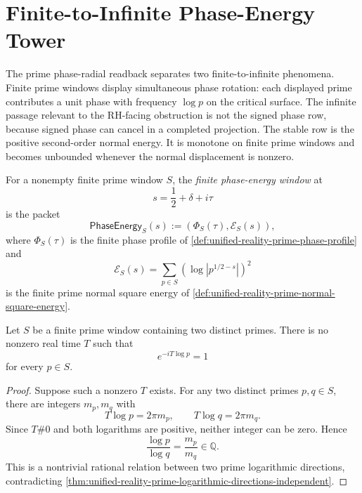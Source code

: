 \section{Finite-to-Infinite Phase-Energy Tower}
\label{sec:unified-reality-finite-to-infinite-phase-energy-tower}

The prime phase-radial readback separates two finite-to-infinite
phenomena.  Finite prime windows display simultaneous phase rotation:
each displayed prime contributes a unit phase with frequency $\log p$ on
the critical surface.  The infinite passage relevant to the RH-facing
obstruction is not the signed phase row, because signed phase can cancel
in a completed projection.  The stable row is the positive second-order
normal energy.  It is monotone on finite prime windows and becomes
unbounded whenever the normal displacement is nonzero.

\begin{definition}
\label{def:unified-reality-finite-phase-energy-window}
For a nonempty finite prime window $S$, the \emph{finite phase-energy
window} at
$$
s=\frac12+\delta+i\tau
$$
is the packet
$$
\mathsf{PhaseEnergy}_S(s)
:=
\left(
\Phi_S(\tau),
\mathcal E_S(s)
\right),
$$
where $\Phi_S(\tau)$ is the finite phase profile of
\autoref{def:unified-reality-prime-phase-profile} and
$$
\mathcal E_S(s)
=
\sum_{p\in S}
\left(\log |p^{1/2-s}|\right)^2
$$
is the finite prime normal square energy of
\autoref{def:unified-reality-prime-normal-square-energy}.
\end{definition}

\begin{theorem}
\label{thm:unified-reality-finite-prime-phase-windows-no-common-period}
Let $S$ be a finite prime window containing two distinct primes.  There
is no nonzero real time $T$ such that
$$
e^{-iT\log p}=1
$$
for every $p\in S$.
\end{theorem}

\begin{proof}
Suppose such a nonzero $T$ exists.  For any two distinct primes
$p,q\in S$, there are integers $m_p,m_q$ with
$$
T\log p=2\pi m_p,
\qquad
T\log q=2\pi m_q.
$$
Since $T\#0$ and both logarithms are positive, neither integer can be
zero.  Hence
$$
\frac{\log p}{\log q}
=
\frac{m_p}{m_q}
\in\mathbb Q.
$$
This is a nontrivial rational relation between two prime logarithmic
directions, contradicting
\autoref{thm:unified-reality-prime-logarithmic-directions-independent}.
\end{proof}

